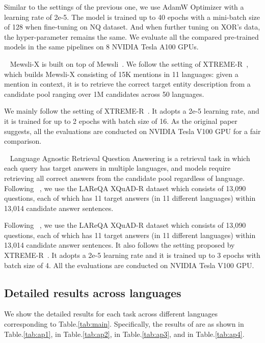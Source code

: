 Similar to the settings of the previous one, we use AdamW Optimizer with a learning rate of 2e-5. The model is trained up to 40 epochs with a mini-batch size of 128 when fine-tuning on NQ dataset. And when further tuning on XOR's data, the hyper-parameter remains the same. We evaluate all the compared pre-trained models in the same pipelines on 8 NVIDIA Tesla A100 GPUs.

 ~\citep{ruder-etal-2021-xtreme}
Mewsli-X is built on top of Mewsli~\citep{botha-etal-2020-entity}. We follow the setting of XTREME-R~\citep{ruder-etal-2021-xtreme}, which builds Mewsli-X consisting of 15K mentions in 11 languages: given a mention in context, it is to retrieve the correct target entity description from a candidate pool ranging over 1M candidates across 50 languages. 

We mainly follow the setting of XTREME-R~\citep{hu2020xtreme}. It adopts a 2e-5 learning rate, and it is trained for up to 2 epochs with batch size of 16.  As the original paper suggests, all the evaluations are conducted on NVIDIA Tesla V100 GPU for a fair comparison.

 ~\citep{roy-etal-2020-lareqa}
Language Agnostic Retrieval Question Answering is a retrieval task in which each query has target answers in multiple languages, and models require retrieving all correct answers from the candidate pool regardless of language.  Following ~\citet{ruder-etal-2021-xtreme}, we use the LAReQA XQuAD-R dataset which consists of 13,090 questions, each of which has 11 target answers (in 11 different languages) within 13,014 candidate answer sentences. 

Following ~\citet{ruder-etal-2021-xtreme}, we use the LAReQA XQuAD-R dataset which consists of 13,090 questions, each of which has 11 target answers (in 11 different languages) within 13,014 candidate answer sentences. It also follows the setting proposed by XTREME-R~\citep{hu2020xtreme}. It adopts a 2e-5 learning rate and it is trained up to 3 epochs with batch size of 4. All the evaluations are conducted on NVIDIA Tesla V100 GPU.


\subsection{Detailed results across languages}
\label{ap:across}
We show the detailed results for each task across different languages corresponding to Table.\ref{tab:main}. Specifically, the results of \tydi are as shown in Table.\ref{tab:ap1}, \xor in Table.\ref{tab:ap2}, \news in Table.\ref{tab:ap3}, and \lqa in Table.\ref{tab:ap4}. 


